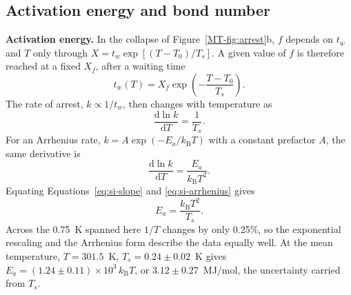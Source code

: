 \documentclass[11pt]{article}
\begin{document}
\subsection{Activation energy and bond number}
\label{sec:bondnumber}
\textbf{Activation energy.} In the collapse of Figure~\ref*{MT-fig:arrest}b, $f$ depends on $t_w$ and $T$ only through $X=t_w\exp[(T-T_0)/T_s]$. A given value of $f$ is therefore reached at a fixed $X_f$, after a waiting time
\begin{equation}
 t_w(T)=X_f\exp\!\left(-\frac{T-T_0}{T_s}\right).
 \label{eq:si-tw}
\end{equation}
The rate of arrest, $k\propto1/t_w$, then changes with temperature as
\begin{equation}
 \frac{\mathrm{d}\ln k}{\mathrm{d}T}=\frac{1}{T_s}.
 \label{eq:si-slope}
\end{equation}
For an Arrhenius rate, $k=A\exp(-E_a/k_\mathrm{B}T)$ with a constant prefactor $A$, the same derivative is
\begin{equation}
 \frac{\mathrm{d}\ln k}{\mathrm{d}T}=\frac{E_a}{k_\mathrm{B}T^2}.
 \label{eq:si-arrhenius}
\end{equation}
Equating Equations~\ref{eq:si-slope} and \ref{eq:si-arrhenius} gives
\begin{equation}
 E_a=\frac{k_\mathrm{B}T^2}{T_s}.
 \label{eq:si-ea}
\end{equation}
Across the 0.75~K spanned here $1/T$ changes by only 0.25\%, so the exponential rescaling and the Arrhenius form describe the data equally well. At the mean temperature, $T=301.5$~K, $T_s=0.24\pm0.02$~K gives $E_a=(1.24\pm0.11)\times10^{3}\,k_\mathrm{B}T$, or $3.12\pm0.27$~MJ/mol, the uncertainty carried from $T_s$.
\end{document}
